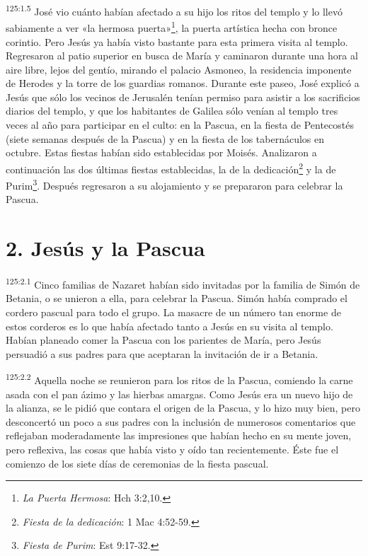\par 
\textsuperscript{125:1.5} José vio cuánto habían afectado a su hijo los ritos del templo y lo llevó sabiamente a ver «la hermosa puerta»\footnote{\textit{La Puerta Hermosa}: Hch 3:2,10.}, la puerta artística hecha con bronce corintio. Pero Jesús ya había visto bastante para esta primera visita al templo. Regresaron al patio superior en busca de María y caminaron durante una hora al aire libre, lejos del gentío, mirando el palacio Asmoneo, la residencia imponente de Herodes y la torre de los guardias romanos. Durante este paseo, José explicó a Jesús que sólo los vecinos de Jerusalén tenían permiso para asistir a los sacrificios diarios del templo, y que los habitantes de Galilea sólo venían al templo tres veces al año para participar en el culto: en la Pascua, en la fiesta de Pentecostés (siete semanas después de la Pascua) y en la fiesta de los tabernáculos en octubre. Estas fiestas habían sido establecidas por Moisés. Analizaron a continuación las dos últimas fiestas establecidas, la de la dedicación\footnote{\textit{Fiesta de la dedicación}: 1 Mac 4:52-59.} y la de Purim\footnote{\textit{Fiesta de Purim}: Est 9:17-32.}. Después regresaron a su alojamiento y se prepararon para celebrar la Pascua.

\section*{2. Jesús y la Pascua}
\par 
\textsuperscript{125:2.1} Cinco familias de Nazaret habían sido invitadas por la familia de Simón de Betania, o se unieron a ella, para celebrar la Pascua. Simón había comprado el cordero pascual para todo el grupo. La masacre de un número tan enorme de estos corderos es lo que había afectado tanto a Jesús en su visita al templo. Habían planeado comer la Pascua con los parientes de María, pero Jesús persuadió a sus padres para que aceptaran la invitación de ir a Betania.

\par 
\textsuperscript{125:2.2} Aquella noche se reunieron para los ritos de la Pascua, comiendo la carne asada con el pan ázimo y las hierbas amargas. Como Jesús era un nuevo hijo de la alianza, se le pidió que contara el origen de la Pascua, y lo hizo muy bien, pero desconcertó un poco a sus padres con la inclusión de numerosos comentarios que reflejaban moderadamente las impresiones que habían hecho en su mente joven, pero reflexiva, las cosas que había visto y oído tan recientemente. Éste fue el comienzo de los siete días de ceremonias de la fiesta pascual.

